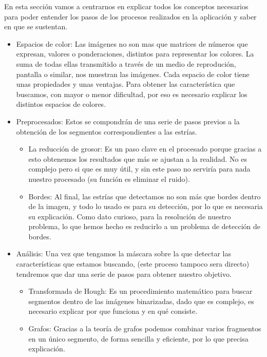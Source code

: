 En esta sección vamos a centrarnos en explicar todos los conceptos necesarios para poder entender los pasos de los procesos realizados en la aplicación y saber en que se sustentan.

\begin{itemize}
\item Espacios de color: Las imágenes no son mas que matrices de números que expresan, valores o ponderaciones, distintos para representar los colores. La suma de todas ellas transmitido a través de un medio de reprodución, pantalla o similar, nos muestran las imágenes.
Cada espacio de color tiene unas propiedades y unas ventajas. Para obtener las característica que buscamos, con mayor o menor dificultad, por eso es necesario explicar los distintos espacios de colores.

\item Preprocesados:
Estos se compondrán de una serie de pasos previos a la obtención de los segmentos correspondientes a las estrías.
	\begin{itemize}
		\item La reducción de grosor: Es un paso clave en el procesado porque gracias a esto obtenemos los resultados que más se ajustan a la realidad.
No es complejo pero si que es muy útil, y sin este paso no serviría para nada nuestro procesado (su función es eliminar el ruido).
		\item Bordes: Al final, las estrías que detectamos no son más que bordes dentro de la imagen, y todo lo usado es para su detección, por lo que es necesaria su explicación. Como dato curioso, para la resolución de nuestro problema, lo que hemos hecho es reducirlo a un problema de detección de bordes.
	\end{itemize}

\item Análisis: 
Una vez que tengamos la máscara sobre la que detectar las características que estamos buscando, (este proceso tampoco sera directo) tendremos que dar  una serie de pasos para obtener nuestro objetivo.
	\begin{itemize}
	\item Transformada de Hough: Es un procedimiento matemático para buscar segmentos dentro de las imágenes binarizadas, dado que es complejo, es necesario explicar por que funciona y en qué consiste.

	\item Grafos: Gracias a la teoría de grafos podemos combinar varios fragmentos en un único segmento, de forma sencilla y eficiente, por lo que precisa explicación.
	\end{itemize}

\end{itemize}



